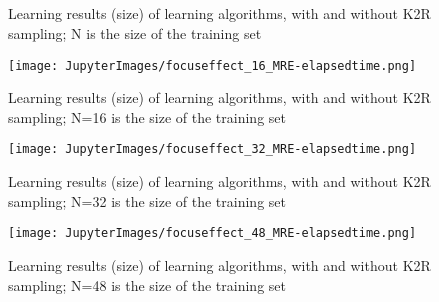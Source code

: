 \begin{figure*}
\centering
{}
\\
\\
\\
\\
\caption[caption]{\label{fig:accuracy-mlalgos-size-matrices}Learning results (size) of learning algorithms, with and without K2R sampling; N is the size of the training set}\end{figure*}\begin{figure}\centering
\texttt{[image: JupyterImages/focuseffect\_16\_MRE-elapsedtime.png]}\caption{\label{tab:accuracy-mlalgos-matrix-time16} Learning results (size) of learning algorithms, with and without K2R sampling; N=16 is the size of the training set}\end{figure}\begin{figure}\centering
\texttt{[image: JupyterImages/focuseffect\_32\_MRE-elapsedtime.png]}\caption{\label{tab:accuracy-mlalgos-matrix-time32} Learning results (size) of learning algorithms, with and without K2R sampling; N=32 is the size of the training set}\end{figure}\begin{figure}\centering
\texttt{[image: JupyterImages/focuseffect\_48\_MRE-elapsedtime.png]}\caption{\label{tab:accuracy-mlalgos-matrix-time48} Learning results (size) of learning algorithms, with and without K2R sampling; N=48 is the size of the training set}\end{figure}\begin{figure}\centering

\end{figure}
